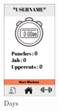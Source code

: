 \documentclass[a4paper,12pt]{report}
\begin{document}
\begin{figure}
\centering
\includegraphics[width=0.25\textwidth]{images/workoutBorder.png}
\caption{\label{fig:isWComponent}Days}
\end{figure}
\end{document}
